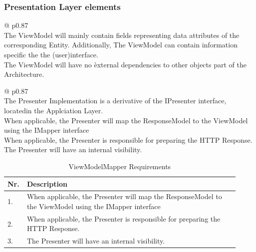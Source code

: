 \subsubsection*{Presentation Layer elements}
\begin{table}[H]
    \begin{tabular}{@{\makebox[2em][c]{\rownumber\space}}  p{0.87\linewidth}}
        \\ 
    \hline
       The ViewModel will mainly contain fields representing data attributes of the
       corresponding Entity. Additionally, The ViewModel can contain information specific
       the the (user)interface. \\

       The ViewModel will have no èxternal dependencies to other objects part of the
       Architecture. \\
       
       \hline
    \end{tabular}
\caption{ViewModel Requirements}
\label{table_requirements_viewmodel}
\end{table}

\begin{table}[H]
    \begin{tabular}{@{\makebox[2em][c]{\rownumber\space}}  p{0.87\linewidth}}
        \\ 
    \hline
    The Presenter Implementation is a derivative of the IPresenter interface,
    locatedin the Applciation Layer. \\   
    
    When applicable, the Presenter will map the ResponseModel to the ViewModel using the IMapper
    interface \\
    
    When applicable, the Presenter is responsible for preparing the HTTP Response.\\
    The Presenter will have an internal visibility.\\
    
    \hline
    \end{tabular}
\caption{Presenter Requirements}
\label{table_requirements_presenter}
\end{table}

\begin{table}[H]
    \begin{tabular}{ m{0.05\linewidth} p{0.87\linewidth} }
    \hline
    \textbf{Nr.} & \textbf{Description} \\ 
    \hline
       1. & When applicable, the Presenter will map the ResponseModel to the ViewModel using the IMapper
       interface \\
       2. & When applicable, the Presenter is responsible for preparing the HTTP Response.\\
       3. & The Presenter will have an internal visibility.\\
       \hline
    \end{tabular}
\caption{ViewModelMapper Requirements}
\label{table_requirements_viewModelMapper}
\end{table}